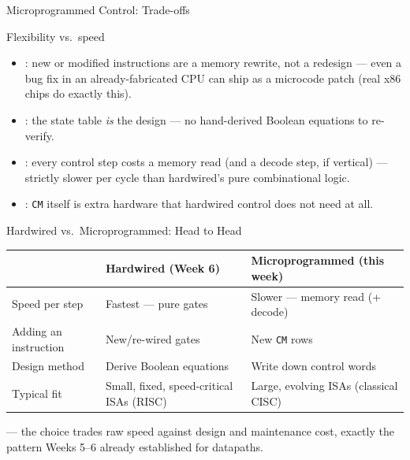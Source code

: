 \documentclass[aspectratio=169]{beamer}
\begin{document}
\begin{frame}{Microprogrammed Control: Trade-offs}
  \begin{block}{Flexibility vs.\ speed}
    \begin{itemize}
      \item {}: new or modified instructions are a memory rewrite,
        not a redesign --- even a bug fix in an already-fabricated CPU can
        ship as a microcode patch (real x86 chips do exactly this).
      \item {}: the state table \emph{is} the design --- no
        hand-derived Boolean equations to re-verify.
      \item {}: every control step costs a memory read (and a decode
        step, if vertical) --- strictly slower per cycle than hardwired's
        pure combinational logic.
      \item {}: \texttt{CM} itself is extra hardware that hardwired
        control does not need at all.
    \end{itemize}
  \end{block}
\end{frame}

\begin{frame}{Hardwired vs.\ Microprogrammed: Head to Head}
  \footnotesize
  \begin{tabular}{@{}lll@{}}
    \toprule
    & \textbf{Hardwired (Week 6)} & \textbf{Microprogrammed (this week)} \\
    \midrule
    Speed per step & Fastest --- pure gates & Slower --- memory read (+ decode) \\
    Adding an instruction & New/re-wired gates & New \texttt{CM} rows \\
    Design method & Derive Boolean equations & Write down control words \\
    Typical fit & Small, fixed, speed-critical ISAs (RISC) & Large, evolving ISAs (classical CISC) \\
    \bottomrule
  \end{tabular}
  \vspace{0.3cm}
   --- the choice trades raw
  speed against design and maintenance cost, exactly the pattern Weeks 5--6
  already established for datapaths.
\end{frame}
\end{document}

